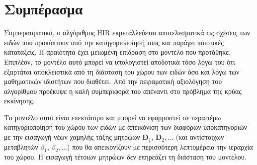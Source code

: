 \section{Συμπέρασμα}
Συμπερασματικά, ο αλγόριθμος {\en HIR} εκμεταλλεύεται αποτελεσματικά τις σχέσεις των ειδών που προκύπτουν από την κατηγοριοποίησή τους και παράγει ποιοτικές κατατάξεις. Η αραιότητα έχει μειωμένη επίδραση στο μοντέλο που προτάθηκε. Επιπλέον, το μοντέλο αυτό μπορεί να υπολογιστεί αποδοτικά τόσο λόγω του ότι εξαρτάται απόκλειστικά από τη διάσταση του χώρου των ειδών όσο και λόγω των μαθηματικών ιδιοτήτων που διαθέτει. Από την πειραματική αξιολόγηση του αλγορίθμου προέκυψε η καλή συμπεριφορά του απέναντι στο πρόβλημα της κρύας εκκίνησης. \par
Το μοντέλο αυτό είναι επεκτάσιμο και μπορεί να εφαρμοστεί σε περαιτέρω κατηγοριοποίηση του χώρου των ειδών με απεικόνιση των διαφόρων υποκατηγοριών με την εισαγωγή νέων χαμηλής τάξης μητρώων $\mathbf{D}_1$, $\mathbf{D}_2, \dots$ (και αντίστοιχων μεταβλητών $\beta_1$, $\beta_2, \dots$) που θα απεικονίζουν με περισσότερη λεπτομέρεια την ιεραρχία του χώρου. Η εισαγωγή τέτοιων μητρώων δεν επηρεάζει τη διάσταση του μοντέλου. 